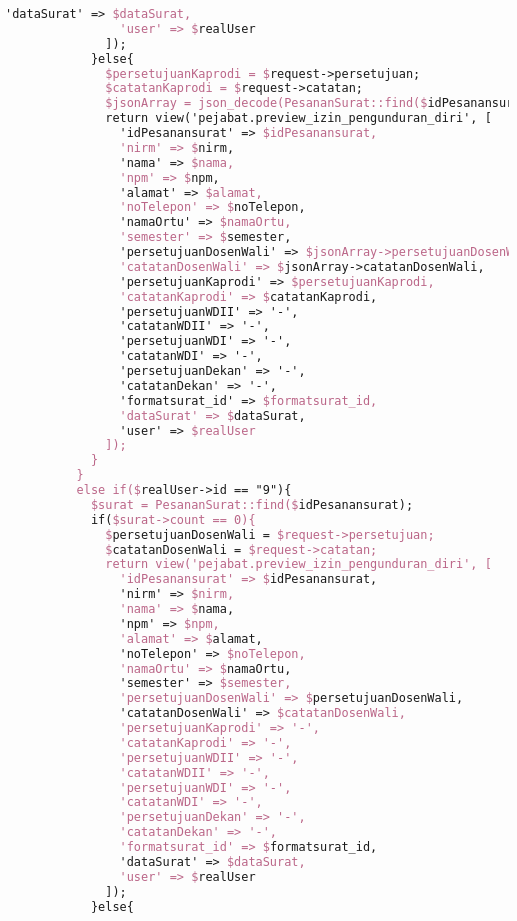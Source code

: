 \begin{lstlisting}[language=tex,basicstyle=\tiny,caption=PesanansuratController.php]
                'dataSurat' => $dataSurat,
                'user' => $realUser
              ]);
            }else{
              $persetujuanKaprodi = $request->persetujuan;
              $catatanKaprodi = $request->catatan;
              $jsonArray = json_decode(PesananSurat::find($idPesanansurat)->dataSurat);
              return view('pejabat.preview_izin_pengunduran_diri', [
                'idPesanansurat' => $idPesanansurat,
                'nirm' => $nirm,
                'nama' => $nama,
                'npm' => $npm,
                'alamat' => $alamat,
                'noTelepon' => $noTelepon,
                'namaOrtu' => $namaOrtu,
                'semester' => $semester,
                'persetujuanDosenWali' => $jsonArray->persetujuanDosenWali,
                'catatanDosenWali' => $jsonArray->catatanDosenWali,
                'persetujuanKaprodi' => $persetujuanKaprodi,
                'catatanKaprodi' => $catatanKaprodi,
                'persetujuanWDII' => '-',
                'catatanWDII' => '-',
                'persetujuanWDI' => '-',
                'catatanWDI' => '-',
                'persetujuanDekan' => '-',
                'catatanDekan' => '-',
                'formatsurat_id' => $formatsurat_id,
                'dataSurat' => $dataSurat,
                'user' => $realUser
              ]);
            }
          }
          else if($realUser->id == "9"){
            $surat = PesananSurat::find($idPesanansurat);
            if($surat->count == 0){
              $persetujuanDosenWali = $request->persetujuan;
              $catatanDosenWali = $request->catatan;
              return view('pejabat.preview_izin_pengunduran_diri', [
                'idPesanansurat' => $idPesanansurat,
                'nirm' => $nirm,
                'nama' => $nama,
                'npm' => $npm,
                'alamat' => $alamat,
                'noTelepon' => $noTelepon,
                'namaOrtu' => $namaOrtu,
                'semester' => $semester,
                'persetujuanDosenWali' => $persetujuanDosenWali,
                'catatanDosenWali' => $catatanDosenWali,
                'persetujuanKaprodi' => '-',
                'catatanKaprodi' => '-',
                'persetujuanWDII' => '-',
                'catatanWDII' => '-',
                'persetujuanWDI' => '-',
                'catatanWDI' => '-',
                'persetujuanDekan' => '-',
                'catatanDekan' => '-',
                'formatsurat_id' => $formatsurat_id,
                'dataSurat' => $dataSurat,
                'user' => $realUser
              ]);
            }else{

\end{lstlisting}
